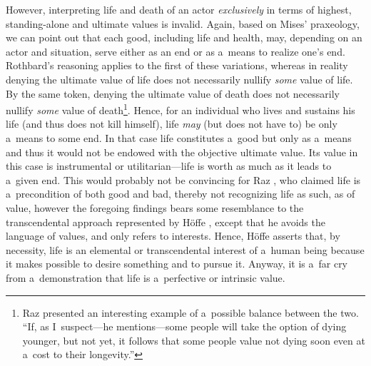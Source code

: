 However, interpreting life and death of an actor \textit{exclusively} in terms of highest, standing-alone and ultimate values is invalid. Again, based on Mises' 
\parencite*[][pp.92–96]{} %
 praxeology, we can point out that each good, including life and health, may, depending on an actor and situation, serve either as an end or as a~means to realize one's end. Rothbard's reasoning applies to the first of these variations, whereas in reality denying the ultimate value of life does not necessarily nullify \textit{some} value of life. By the same token, denying the ultimate value of death does not necessarily nullify \textit{some} value of death\footnote{Raz 
\parencite*[][p.97]{} %
 presented an interesting example of a~possible balance between the two. ``If, as I~suspect---he mentions---some people will take the option of dying younger, but not yet, it follows that some people value not dying soon even at a~cost to their longevity.''}. Hence, for an individual who lives and sustains his life (and thus does not kill himself), life \textit{may} (but does not have to) be only a~means to some end. In that case life constitutes a~good but only as a~means and thus it would not be endowed with the objective ultimate value. Its value in this case is instrumental or utilitarian---life is worth as much as it leads to a~given end. This would probably not be convincing for Raz 
\parencites[][p.191]{}[][pp.8]{}, %
 who claimed life is a~precondition of both good and bad, thereby not recognizing life as such, as of value, however the foregoing findings bears some resemblance to the transcendental approach represented by Höffe 
\parencites*[][]{}[][]{}, %
 except that he avoids the language of values, and only refers to interests. Hence, Höffe 
\parencite*[][p.131]{} %
 asserts that, by necessity, life is an elemental or transcendental interest of a~human being because it makes possible to desire something and to pursue it. Anyway, it is a~far cry from a~demonstration that life is a~perfective or intrinsic value.



